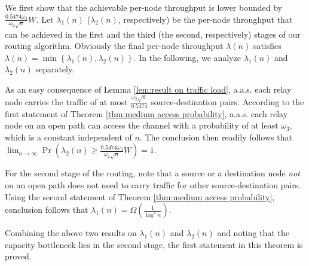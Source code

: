 \documentclass[english]{IEEEtran}
\theoremstyle{plain}
\theoremstyle{plain}
\theoremstyle{plain}
\theoremstyle{remark}
\begin{document}
\begin{IEEEproof}
We first show that the achievable per-node throughput is lower bounded
by $\frac{0.5474\omega_{3}}{\omega_{2}\sqrt{n}}W$. Let $\lambda_{1}\left(n\right)$
($\lambda_{2}\left(n\right)$, respectively) be the per-node throughput
that can be achieved in the first and the third (the second, respectively)
stages of our routing algorithm. Obviously the final per-node throughput
$\lambda\left(n\right)$ satisfies $\lambda\left(n\right)=\min\left\{ \lambda_{1}\left(n\right),\lambda_{2}\left(n\right)\right\} $.
In the following, we analyze $\lambda_{1}\left(n\right)$ and $\lambda_{2}\left(n\right)$
separately.

As an easy consequence of Lemma \ref{lem:result on traffic load},
a.a.s. each relay node carries the traffic of at most $\frac{\omega_{2}\sqrt{n}}{0.5474}$
source-destination pairs. According to the first statement of Theorem
\ref{thm:medium access probability}, a.a.s. each relay node on an
open path can access the channel with a probability of at least $\omega_{3}$,
which is a constant independent of $n$. The conclusion then readily
follows that $\lim_{n\rightarrow\infty}\Pr\left(\lambda_{2}\left(n\right)\geq\frac{0.5474\omega_{3}}{\omega_{2}\sqrt{n}}W\right)=1$.

For the second stage of the routing, note that a source or a destination
node \emph{not} on an open path does not need to carry traffic for
other source-destination pairs. Using the second statement of Theorem
\ref{thm:medium access probability}, conclusion follows that $\lambda_{1}\left(n\right)=\Omega\left(\frac{1}{\log^{4}n}\right)$.

Combining the above two results on $\lambda_{1}\left(n\right)$ and
$\lambda_{2}\left(n\right)$ and noting that the capacity bottleneck
lies in the second stage, the first statement in this theorem is proved.


\end{IEEEproof}
\end{document}

